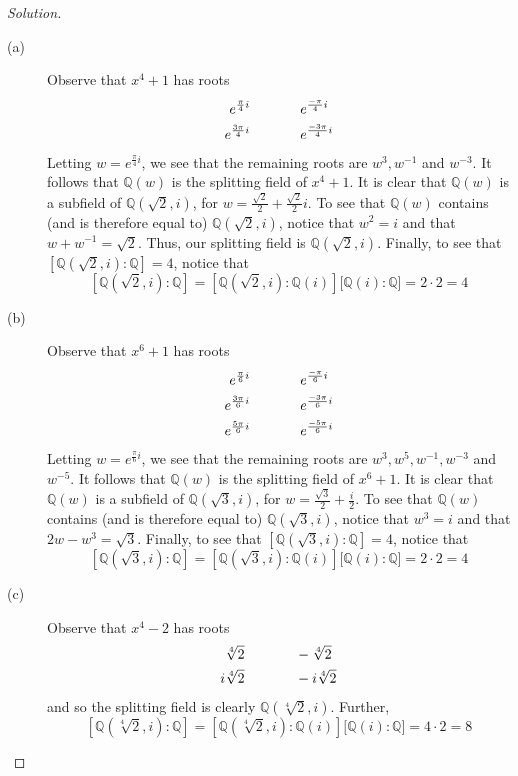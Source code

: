 \documentclass[12pt,leqno]{article}
\numberwithin{equation}{section}
\theoremstyle{definition}
\begin{document}
\begin{proof}[Solution]
 \begin{description}
  \item [(a)] Observe that $x^4+1$ has roots {\Large\begin{align*}e^{\frac{\pi}{4}i}&\hskip.5in e^{\frac{-\pi}{4}i}\\e^{\frac{3\pi}{4}i}&\hskip.5in e^{\frac{-3\pi}{4}i}\end{align*}} Letting $w=e^{\frac{\pi}{4}i}$, we see that the remaining roots are $w^3,w^{-1}$ and $w^{-3}$. It follows that $\mathbb{Q}(w)$ is the splitting field of $x^4+1$. It is clear that $\mathbb{Q}(w)$ is a subfield of $\mathbb{Q}(\sqrt{2},i)$, for $w=\frac{\sqrt{2}}{2}+\frac{\sqrt{2}}{2}i$. To see that $\mathbb{Q}(w)$ contains (and is therefore equal to) $\mathbb{Q}(\sqrt{2},i)$, notice that $w^2=i$ and that $w+w^{-1}=\sqrt{2}$. Thus, our splitting field is $\mathbb{Q}(\sqrt{2},i)$. Finally, to see that $[\mathbb{Q}(\sqrt{2},i):\mathbb{Q}]=4$, notice that \[\left[\mathbb{Q}(\sqrt{2},i):\mathbb{Q}\right]=\left[\mathbb{Q}(\sqrt{2},i):\mathbb{Q}(i)\right]\Big[\mathbb{Q}(i):\mathbb{Q}\Big]=2\cdot2=4\]
  \item [(b)] Observe that $x^6+1$ has roots {\Large\begin{align*}e^{\frac{\pi}{6}i}&\hskip.5in e^{\frac{-\pi}{6}i}\\e^{\frac{3\pi}{6}i}&\hskip.5in e^{\frac{-3\pi}{6}i}\\e^{\frac{5\pi}{6}i}&\hskip.5in e^{\frac{-5\pi}{6}i}\end{align*}} Letting $w=e^{\frac{\pi}{6}i}$, we see that the remaining roots are $w^3,w^5,w^{-1},w^{-3}$ and $w^{-5}$. It follows that $\mathbb{Q}(w)$ is the splitting field of $x^6+1$. It is clear that $\mathbb{Q}(w)$ is a subfield of $\mathbb{Q}(\sqrt{3},i)$, for $w=\frac{\sqrt{3}}{2}+\frac{i}{2}$. To see that $\mathbb{Q}(w)$ contains (and is therefore equal to) $\mathbb{Q}(\sqrt{3},i)$, notice that $w^3=i$ and that $2w-w^3=\sqrt{3}$. Finally, to see that $[\mathbb{Q}(\sqrt{3},i):\mathbb{Q}]=4$, notice that \[\left[\mathbb{Q}(\sqrt{3},i):\mathbb{Q}\right]=\left[\mathbb{Q}(\sqrt{3},i):\mathbb{Q}(i)\right]\Big[\mathbb{Q}(i):\mathbb{Q}\Big]=2\cdot2=4\]
  \item [(c)] Observe that $x^4-2$ has roots {\Large\begin{align*}\sqrt[4]{2}&\hskip.5in -\sqrt[4]{2}\\ i\sqrt[4]{2}&\hskip.5in -i\sqrt[4]{2}\end{align*}} and so the splitting field is clearly $\mathbb{Q}(\sqrt[4]{2},i)$. Further, \[\left[\mathbb{Q}(\sqrt[4]{2},i):\mathbb{Q}\right]=\left[\mathbb{Q}(\sqrt[4]{2},i):\mathbb{Q}(i)\right]\Big[\mathbb{Q}(i):\mathbb{Q}\Big]=4\cdot2=8\]

\end{description}
\end{proof}
\end{document}

